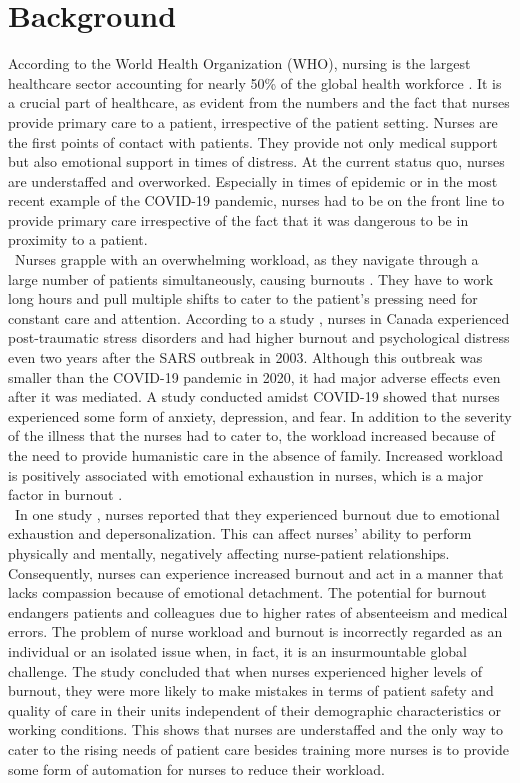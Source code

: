 \section{Background}
According to the World Health Organization (WHO), nursing is the largest healthcare sector accounting for nearly 50\% of the global health workforce \cite{bib1}. It is a crucial part of healthcare, as evident from the numbers and the fact that nurses provide primary care to a patient, irrespective of the patient setting. Nurses are the first points of contact with patients. They provide not only medical support but also emotional support in times of distress. At the current status quo, nurses are understaffed and overworked. Especially in times of epidemic or in the most recent example of the COVID-19 pandemic, nurses had to be on the front line to provide primary care irrespective of the fact that it was dangerous to be in proximity to a patient. \\\ Nurses grapple with an overwhelming workload, as they navigate through a large number of patients simultaneously, causing burnouts \cite{burnout}. They have to work long hours \cite{stress} and pull multiple shifts to cater to the patient's pressing need for constant care and attention. According to a study \cite{bib2}, nurses in Canada experienced post-traumatic stress disorders and had higher burnout and psychological distress even two years after the SARS outbreak in 2003. Although this outbreak was smaller than the COVID-19 pandemic in 2020, it had major adverse effects even after it was mediated. A study conducted amidst COVID-19 \cite{bib3} showed that nurses experienced some form of anxiety, depression, and fear. In addition to the severity of the illness that the nurses had to cater to, the workload increased because of the need to provide humanistic care in the absence of family. Increased workload is positively associated with emotional exhaustion in nurses, which is a major factor in burnout \cite{emotional}.\\\ In one study \cite{compassion}, nurses reported that they experienced burnout due to emotional exhaustion and depersonalization. This can affect nurses' ability to perform physically and mentally, negatively affecting nurse-patient relationships. Consequently, nurses can experience increased burnout and act in a manner that lacks compassion because of emotional detachment. The potential for burnout endangers patients and colleagues due to higher rates of absenteeism and medical errors. The problem of nurse workload and burnout is incorrectly regarded as an individual or an isolated issue when, in fact, it is an insurmountable global challenge. The study \cite{JUN2021103933} concluded that when nurses experienced higher levels of burnout, they were more likely to make mistakes in terms of patient safety and quality of care in their units independent of their demographic characteristics or working conditions. This shows that nurses are understaffed and the only way to cater to the rising needs of patient care besides training more nurses is to provide some form of automation for nurses to reduce their workload.\\\
